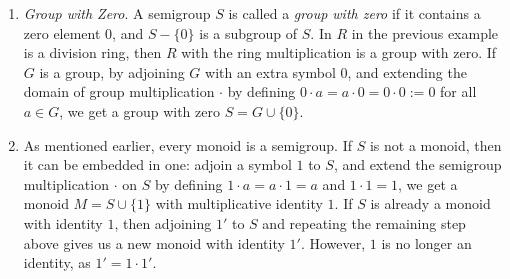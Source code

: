 \documentclass[12pt]{article}
\begin{document}
\begin{enumerate}
\item \emph{Group with Zero}.  A semigroup $S$ is called a \emph{group with zero} if it contains a zero element $0$, and $S-\lbrace 0\rbrace$ is a subgroup of $S$.  In $R$ in the previous example is a division ring, then $R$ with the ring multiplication is a group with zero.  If $G$ is a group, by adjoining $G$ with an extra symbol $0$, and extending the domain of group multiplication $\cdot$ by defining $0 \cdot a = a\cdot 0 =0\cdot 0:=0$ for all $a\in G$, we get a group with zero $S=G\cup \lbrace 0\rbrace$.
\item As mentioned earlier, every monoid is a semigroup.  If $S$ is not a monoid, then it can be embedded in one: adjoin a symbol $1$ to $S$, and extend the semigroup multiplication $\cdot$ on $S$ by defining $1\cdot a = a\cdot 1 = a$ and $1\cdot 1=1$, we get a monoid $M=S\cup \lbrace 1\rbrace$ with multiplicative identity $1$.  If $S$ is already a monoid with identity $1$, then adjoining $1'$ to $S$ and repeating the remaining step above gives us a new monoid with identity $1'$.  However, $1$ is no longer an identity, as $1'=1\cdot 1'$.
\end{enumerate}
\end{document}
